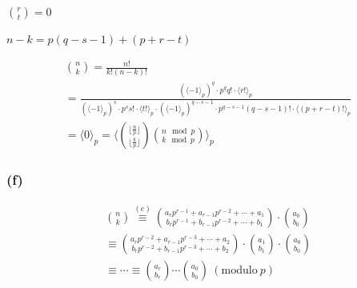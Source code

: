 \documentclass{article}
\begin{document}
\( \binom{r}{t} = 0 \)

\( n - k = p(q-s-1) + (p + r -t) \)

\begin{multline*}
\binom{n}{k} = \frac{n!}{k!(n-k)!} \\
= \frac{{(\langle-1\rangle_{p})}^{q} \cdot p^{q} q! \cdot \langle r!\rangle_{p}}{{(\langle-1\rangle_{p})}^{s} \cdot p^{s} s! \cdot \langle t!\rangle_{p} \cdot {(\langle-1\rangle_{p})}^{q-s-1} \cdot p^{q-s-1} (q-s-1)! \cdot \langle (p+r-t)!\rangle_{p}} \\
= \langle 0 \rangle_{p} = \langle\binom{\lfloor\frac{n}{p}\rfloor}{\lfloor\frac{k}{p}\rfloor}\binom{n \mod p}{k \mod p}\rangle_{p}
\end{multline*}

\subsubsection*{(f)}

\begin{multline*}
\binom{n}{k} \overset{(e)}{\equiv} \binom{a_{r}p^{r-1} + a_{r-1} p^{r-2} + \cdots + a_{1}}{b_{r}p^{r-1} + b_{r-1} p^{r-2} + \cdots + b_{1}} \cdot \binom{a_{0}}{b_{0}} \\
\equiv \binom{a_{r}p^{r-2} + a_{r-1} p^{r-3} + \cdots + a_{2}}{b_{r}p^{r-2} + b_{r-1} p^{r-3} + \cdots + b_{2}} \cdot \binom{a_{1}}{b_{1}} \cdot \binom{a_{0}}{b_{0}} \\
\equiv \cdots \equiv \binom{a_{r}}{b_{r}} \cdots \binom{a_{0}}{b_{0}}\ (\mathrm{modulo}\ p)
\end{multline*}
\end{document}
